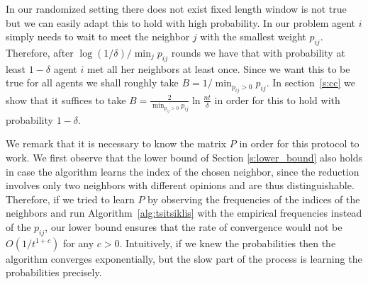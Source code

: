 In our randomized setting there does not exist fixed length window is
not true but we can easily adapt this to hold with high probability.
In our problem
agent $i$ simply needs to wait to meet the neighbor $j$ with the smallest
weight $p_{ij}$. Therefore, after $\log(1/\delta)/\min_{j} p_{ij}$ rounds
we have that with probability at least $1-\delta$ agent $i$ met all her
neighbors at least once. Since we want this to be true for all agents
we shall roughly take $B = 1/\min_{p_{ij} > 0} {p_{ij}}$.
In section~\ref{s:cc} we show that it suffices to take
$B = \frac{2}{\min_{p_{ij} > 0} {p_{ij}}}\ln\frac{nt}{\delta}$
in order for this to hold with probability $1-\delta$.

We remark that it is necessary to know the matrix $P$ in order for this
protocol to work. We first observe that the lower bound of Section \ref{s:lower_bound}
also holds in case the algorithm learns the index of the chosen neighbor,
since the reduction involves only two neighbors with different opinions and are
thus distinguishable.
Therefore, if we tried to learn $P$ by observing the frequencies
of the indices of the neighbors and run Algorithm~\ref{alg:tsitsiklis}
with the empirical frequencies instead of the $p_{ij}$, our lower bound
ensures that the rate of convergence would not be $O(1/t^{1+c})$ for any $c>0$.
Intuitively, if we knew the probabilities then the algorithm converges exponentially,
but the slow part of the process is learning the probabilities precisely.


